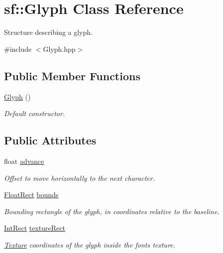 \hypertarget{classsf_1_1_glyph}{}\section{sf\+:\+:Glyph Class Reference}
\label{classsf_1_1_glyph}


Structure describing a glyph.  




{\ttfamily \#include $<$Glyph.\+hpp$>$}

\subsection*{Public Member Functions}
\begin{DoxyCompactItemize}
\item 
\mbox{\label{classsf_1_1_glyph_ab15cfc37eb7b40a94b3b3aedf934010b}} 
\hyperlink{classsf_1_1_glyph_ab15cfc37eb7b40a94b3b3aedf934010b}{Glyph} ()
\begin{DoxyCompactList}\small\item\em Default constructor. \end{DoxyCompactList}\end{DoxyCompactItemize}
\subsection*{Public Attributes}
\begin{DoxyCompactItemize}
\item 
\mbox{\label{classsf_1_1_glyph_aeac19b97ec11409147191606b784deda}} 
float \hyperlink{classsf_1_1_glyph_aeac19b97ec11409147191606b784deda}{advance}
\begin{DoxyCompactList}\small\item\em Offset to move horizontally to the next character. \end{DoxyCompactList}\item 
\mbox{\label{classsf_1_1_glyph_a6f3c892093167914adc31e52e5923f4b}} 
\hyperlink{classsf_1_1_rect}{Float\+Rect} \hyperlink{classsf_1_1_glyph_a6f3c892093167914adc31e52e5923f4b}{bounds}
\begin{DoxyCompactList}\small\item\em Bounding rectangle of the glyph, in coordinates relative to the baseline. \end{DoxyCompactList}\item 
\mbox{\label{classsf_1_1_glyph_a0d502d326449f8c49011ed91d2805f5b}} 
\hyperlink{classsf_1_1_rect}{Int\+Rect} \hyperlink{classsf_1_1_glyph_a0d502d326449f8c49011ed91d2805f5b}{texture\+Rect}
\begin{DoxyCompactList}\small\item\em \hyperlink{classsf_1_1_texture}{Texture} coordinates of the glyph inside the font\textquotesingle{}s texture. \end{DoxyCompactList}\end{DoxyCompactItemize}


